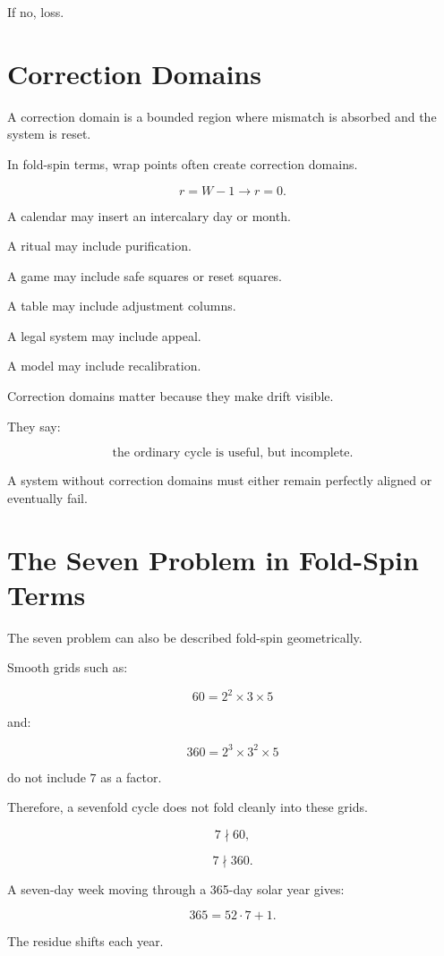 \documentclass[11pt]{book}
\begin{document}
If no, loss.

\section{Correction Domains}

A correction domain is a bounded region where mismatch is absorbed and the system is reset.

In fold-spin terms, wrap points often create correction domains.

\[
r = W-1 \rightarrow r=0.
\]

A calendar may insert an intercalary day or month.

A ritual may include purification.

A game may include safe squares or reset squares.

A table may include adjustment columns.

A legal system may include appeal.

A model may include recalibration.

Correction domains matter because they make drift visible.

They say:

\[
\text{the ordinary cycle is useful, but incomplete}.
\]

A system without correction domains must either remain perfectly aligned or eventually fail.

\section{The Seven Problem in Fold-Spin Terms}

The seven problem can also be described fold-spin geometrically.

Smooth grids such as:

\[
60 = 2^2 \times 3 \times 5
\]

and:

\[
360 = 2^3 \times 3^2 \times 5
\]

do not include \(7\) as a factor.

Therefore, a sevenfold cycle does not fold cleanly into these grids.

\[
7 \nmid 60,
\]

\[
7 \nmid 360.
\]

A seven-day week moving through a 365-day solar year gives:

\[
365 = 52 \cdot 7 + 1.
\]

The residue shifts each year.
\end{document}
